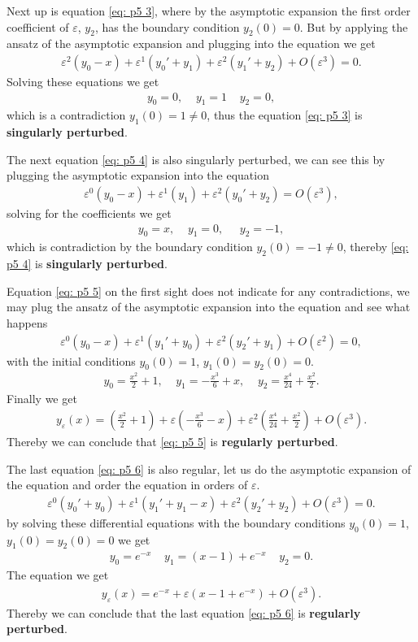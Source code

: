 \documentclass[a4paper]{article}
\newcommand{\eps}{\varepsilon}
\begin{document}
Next up is equation \ref{eq: p5 3}, where by the asymptotic expansion the
first order coefficient of $\eps$, $y_2$, has the boundary condition $y_2(0)
= 0$. But by applying the ansatz of the asymptotic expansion and plugging
into the equation we get
\begin{align}
    \eps^2(y_0 - x) + \eps^1 (y_0' + y_1) + \eps^2(y_1' + y_2) + O(\eps^3) =
    0.
\end{align}
Solving these equations we get
\begin{align}
    y_0 = 0, \;\;\;\; y_1 = 1 \;\;\;\; y_2 = 0 ,
\end{align}
which is a contradiction $y_1(0) = 1 \neq 0 $, thus the equation \ref{eq: p5
3} is \textbf{singularly perturbed}.

The next equation \ref{eq: p5 4} is also singularly perturbed, we
can see this by plugging the asymptotic expansion into the equation
\begin{align}
 \eps^0 ( y_0 - x) + \eps^1(y_1) + \eps^2(y_0' + y_2) = O(\eps^3),
\end{align}
solving for the coefficients we get
\begin{align}
    y_0 = x, \;\;\;\; y_1 = 0, \;\;\;\;\; y_2 = -1,
\end{align}
which is contradiction by the boundary condition $y_2(0) = -1 \neq 0$,
thereby \ref{eq: p5 4} is \textbf{singularly perturbed}.

Equation \ref{eq: p5 5} on the first sight does not indicate for any
contradictions, we may plug the ansatz of the asymptotic expansion into the
equation and see what happens
\begin{align}
    \eps^0(y_0 -x) + \eps^1(y_1' + y_0) + \eps^2(y_2' +y_1) + O(\eps^2) = 0,
\end{align}
with the initial conditions $y_0(0) = 1$, $y_1(0) = y_2(0) = 0$.
\begin{align}
    y_0 = \frac{x^2}{2} + 1, \;\;\;\;
    y_1 = -\frac{x^3}{6} + x, \;\;\;\;
    y_2 = \frac{x^4}{24} + \frac{x^2}{2}.
\end{align}
Finally we get
\begin{align}
    y_\eps(x) = (\frac{x^2}{2}+1) + \eps(-\frac{x^3}{6} -x)
    +\eps^2(\frac{x^4}{24} + \frac{x^2}{2}) + O(\eps^3).
\end{align}
Thereby we can conclude that \ref{eq: p5 5} is \textbf{regularly perturbed}.

The last equation \ref{eq: p5 6} is also regular, let us do the asymptotic
expansion of the equation and order the equation in orders of $\eps$.
\begin{align}
    \eps^0(y_0' + y_0) + \eps^1(y_1' + y_1 -x) + \eps^2(y_2' + y_2)+
    O(\eps^3) = 0 .
\end{align}
by solving these differential equations with the boundary conditions $y_0(0)
= 1$, $y_1(0) = y_2(0) = 0$ we get
\begin{align}
    y_0 =  e^{-x} \;\;\;\; y_1 = (x-1) + e^{-x} \;\;\;\; y_2 = 0.
\end{align}
The equation we get
\begin{align}
    y_\eps(x) = e^{-x} + \eps(x-1 +e^{-x}) + O(\eps^3).
\end{align}
Thereby we can conclude that the last equation \ref{eq: p5 6} is
\textbf{regularly perturbed}.
\end{document}
